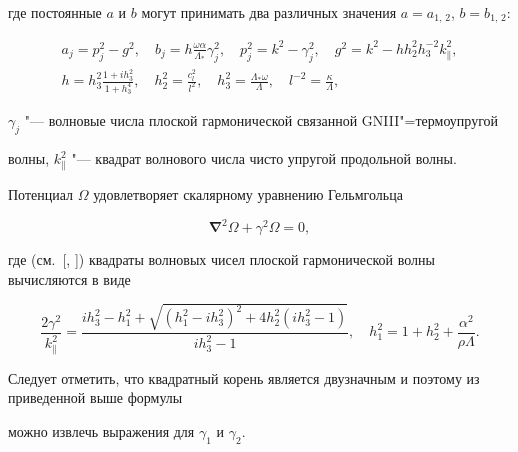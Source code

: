 где постоянные $a$ и $b$ могут принимать два различных значения $a=a_{1,\,2}$, $b=b_{1,\,2}$:

\begin{gather*}

a_j=p_j^2-g^2,\quad

b_j=h\displaystyle\frac{{\omega \alpha }}{{\Lambda _* }}\gamma _j^2,\quad

p_j^2  = k^2  - \gamma _j^2,\quad

g^2=k^2-h h_{2}^{2}h_{3}^{-2}k_{\parallel}^{2},\\

h = h_3^2 \displaystyle\frac{{1 + ih_3^2 }}{{1 + h_3^4 }},\quad

h_2^2  = \displaystyle\frac{{c_l^2 }}{{l^2 }},\quad

h_3^2  = \displaystyle\frac{{\Lambda _* \omega }}{\Lambda },\quad

l^{ - 2}  = \displaystyle\frac{\kappa }{\Lambda },

\end{gather*}

$\gamma _j$ "--- волновые числа плоской гармонической связанной GNIII"=термоупругой

волны, $k_\parallel^2$ "--- квадрат волнового числа чисто упругой продольной волны.

Потенциал $\Omega$ удовлетворяет скалярному уравнению Гельмгольца

\begin{equation}

\label{kov11:eq6}

\boldsymbol\nabla^2 \Omega  + \gamma ^2 \Omega  = 0,

\end{equation}

где (см.~[, ]) квадраты волновых чисел плоской гармонической волны вычисляются в виде

$$

\frac{{2\gamma ^2 }}{{k_\parallel ^2 }} = \frac{{ih_3^2  - h_1^2  + \sqrt {(h_1^2  - ih_3^2 )^2  + 4h_2^2 (ih_3^2  - 1)} }}{{ih_3^2  - 1}},

\quad h_1^2  = 1 + h_2^2  + \frac{{\alpha ^2 }}{{\rho \Lambda }}.

$$

Следует отметить, что квадратный корень является двузначным и поэтому из приведенной выше формулы

можно извлечь выражения для $\gamma_1$ и $\gamma_2$.



